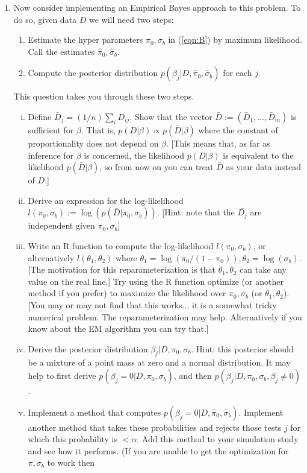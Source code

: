 \documentclass[12pt]{article}
\begin{document}
\begin{enumerate}
\item Now consider implementing an Empirical Bayes approach to this problem. To do so, given data $D$ we will need two steps:
\begin{enumerate}[A]
\item Estimate the hyper parameters $\pi_0,\sigma_b$ in (\ref{eqn:B}) by maximum likelihood. Call the estimates $\hat\pi_0, \hat\sigma_b$.
\item Compute the posterior distribution $p(\beta_j | D, \hat\pi_0,\hat\sigma_b)$ for each $j$.
\end{enumerate}
This question takes you through these two steps.
\begin{enumerate}[i)]
\item Define $\bar{D}_j = (1/n) \sum_i D_{ij}$. Show that the vector $\bar{D}:=(\bar{D}_1,\dots,\bar{D}_m)$ is sufficient for $\beta$. 
That is, $p(D|\beta) \propto p(\bar{D} | \beta)$ where the constant of proportionality does not depend on $\beta$. [This means that,
as far as inference for $\beta$ is concerned,  the likelihood $p(D| \beta)$ is equivalent to the likelihood $p(\bar{D} | \beta)$, so from now on you can treat $\bar{D}$ as
your data instead of $D$.] 
\item Derive an expression for the log-likelihood $l(\pi_0,\sigma_b) :=\log(p(\bar{D} | \pi_0,\sigma_b))$. [Hint: note that the $\bar{D_j}$ are independent given $\pi_0,\sigma_b$]
\item Write an R function to compute the log-likelihood $l(\pi_0,\sigma_b)$, or alternatively $l(\theta_1,\theta_2)$ where 
$\theta_1 = \log(\pi_0/(1-\pi_0)), \theta_2 = \log(\sigma_b)$. [The motivation for this reparameterization is that $\theta_1,\theta_2$ can take
any value on the real line.] Try using the R function optimize (or another method if you prefer)
to maximize the likelihood over $\pi_0,\sigma_b$ (or $\theta_1,\theta_2$).
[You may or may not find that this works... it is a somewhat tricky numerical problem. The reparameterization may help. Alternatively if you know about the EM algorithm
you can try that.]
\item Derive the posterior distribution $\beta_j | D,\pi_0,\sigma_b$. Hint: this posterior should be a mixture of a point mass at zero and a normal distribution. 
It may help to first derive $p(\beta_j = 0 | D, \pi_0, \sigma_b)$, and then $p(\beta_j | D, \pi_0,\sigma_b, \beta_j \neq 0)$.
\item Implement a method that computes $p(\beta_j = 0 | D, \hat\pi_0, \hat\sigma_b)$. Implement another method that takes these probabilities and rejects those tests $j$ for which this probability is $<\alpha$. Add this method to your simulation study and see how it performs. (If you are unable to get the optimization for $\pi,\sigma_b$ to work then

\end{enumerate}
\end{enumerate}
\end{document}
